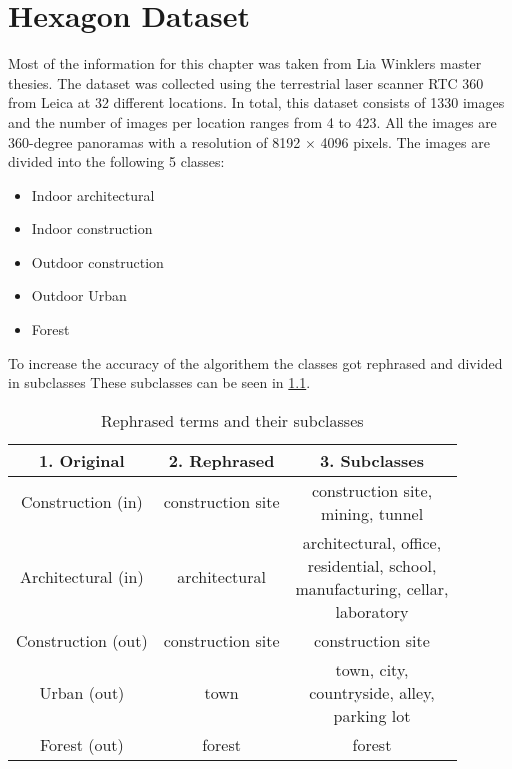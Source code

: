 \chapter{Hexagon Dataset
    \label{chapter:dataset}}
Most of the information for this chapter was taken from Lia Winklers master thesies.
The dataset was collected using the terrestrial laser scanner RTC 360 from Leica at 32
different locations.
In total, this dataset consists of 1330 images and the number of images per location ranges from 4 to 423.
All the images are 360-degree panoramas with a
resolution of 8192 \(\times\) 4096 pixels.
The images are divided into the following 5 classes:

\begin{itemize}
    \item Indoor architectural
    \item Indoor construction
    \item Outdoor construction
    \item Outdoor Urban
    \item Forest
\end{itemize}

\noindent
To increase the accuracy of the algorithem the classes got rephrased and divided in subclasses
These subclasses can be seen in \cref{tab:dataset:subclasses}.
\begin{table}[htbp]
    \centering
    \begin{tabular}{ccc}
    \toprule
    \textbf{1. Original}& \textbf{2. Rephrased}& \textbf{3. Subclasses}\\ \midrule
    Construction (in) & construction site & \makecell{construction site,\\ mining, tunnel}\\ \hline
    Architectural (in)& architectural& \makecell{architectural, office,\\ residential, school,\\ manufacturing, cellar,\\ laboratory} \\ \hline
    Construction (out)& construction site & construction site \\ \hline
    Urban (out)& town & \makecell{town, city,\\countryside, alley,\\ parking lot} \\ \hline
    Forest (out)& forest& forest \\
    \bottomrule
    \end{tabular}
    \caption{Rephrased terms and their subclasses
        \label{tab:dataset:subclasses}}
\end{table}

